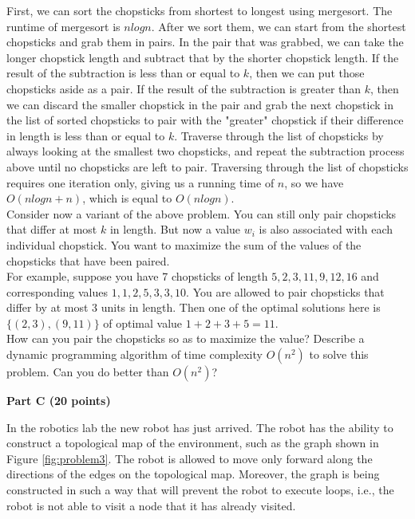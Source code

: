 \documentclass{article}
\begin{document}
\noindent First, we can sort the chopsticks from shortest to longest using mergesort. The runtime of mergesort is $nlogn$. After we sort them, we can start from the shortest chopsticks and grab them in pairs. In the pair that was grabbed, we can take the longer chopstick length and subtract that by the shorter chopstick length. If the result of the subtraction is less than or equal to $k$, then we can put those chopsticks aside as a pair. If the result of the subtraction is greater than $k$, then we can discard the smaller chopstick in the pair and grab the next chopstick in the list of sorted chopsticks to pair with the "greater" chopstick if their difference in length is less than or equal to $k$. Traverse through the list of chopsticks by always looking at the smallest two chopsticks, and repeat the subtraction process above until no chopsticks are left to pair. Traversing through the list of chopsticks requires one iteration only, giving us a running time of $n$, so we have $O(nlogn + n)$, which is equal to $O(nlogn)$.\\

 Consider now a variant of the above problem. You
can still only pair chopsticks that differ at most $k$ in length. But
now a value $w_{i}$ is also associated with each individual
chopstick. You want to maximize the sum of the values of the
chopsticks that have been paired.\\

\noindent For example, suppose you have 7 chopsticks of length
$5,2,3,11,9,12,16$ and corresponding values $1,1,2,5,3,3,10$. You are
allowed to pair chopsticks that differ by at most 3 units in
length. Then one of the optimal solutions here is $\{ (2,3),(9,11) \}$
of optimal value $1+2+3+5=11$.\\

\noindent How can you pair the chopsticks so as to maximize the value?
Describe a dynamic programming algorithm of time complexity $O(n^{2})$
to solve this problem. Can you do better than $O(n^{2})$?\\

\begin{center}
{\bf Part C (20 points)}
\end{center}


 In the robotics lab the new robot has just
arrived. The robot has the ability to construct a topological map of
the environment, such as the graph shown in Figure
\ref{fig:problem3}. The robot is allowed to move only forward along
the directions of the edges on the topological map. Moreover, the
graph is being constructed in such a way that will prevent the robot
to execute loops, i.e., the robot is not able to visit a node that it
has already visited.\\
\end{document}
